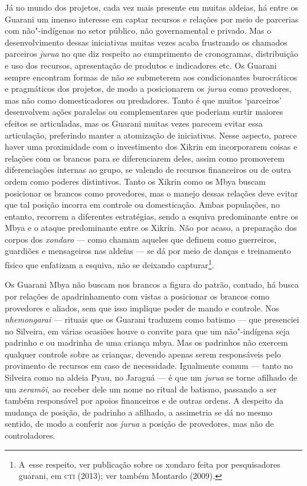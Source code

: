 Já no mundo dos projetos, cada vez mais presente em muitas aldeias, há
entre os Guarani um imenso interesse em captar recursos e relações por
meio de parcerias com não"-indígenas no setor público, não governamental
e privado. Mas o desenvolvimento dessas iniciativas muitas vezes acaba
frustrando os chamados parceiros \emph{jurua} no que diz respeito ao
cumprimento de cronogramas, distribuição e uso dos recursos,
apresentação de produtos e indicadores etc. Os Guarani sempre encontram
formas de não se submeterem aos condicionantes burocráticos e
pragmáticos dos projetos, de modo a posicionarem os \emph{jurua} como
provedores, mas não como domesticadores ou predadores. Tanto é que
muitos `parceiros' desenvolvem ações paralelas ou complementares que
poderiam surtir maiores efeitos se articuladas, mas os Guarani muitas
vezes parecem evitar essa articulação, preferindo manter a atomização
de iniciativas. Nesse aspecto, parece haver uma proximidade com o
investimento dos Xikrin em incorporarem coisas e relações com os
brancos para se diferenciarem deles, assim como promoverem
diferenciações internas ao grupo, se valendo de recursos financeiros ou
de outra ordem como poderes distintivos. Tanto os Xikrin como os Mbya
buscam posicionar os brancos como provedores, mas o manejo dessas
relações deve evitar que tal posição incorra em controle ou
domesticação. Ambas populações, no entanto, recorrem a diferentes
estratégias, sendo a esquiva predominante entre os Mbya e o ataque
predominante entre os Xikrin. Não por acaso, a preparação dos corpos
dos \emph{xondaro} --- como chamam aqueles que definem como guerreiros,
guardiões e mensageiros nas aldeias --- se dá por meio de danças e
treinamento físico que enfatizam a esquiva, não se deixando
capturar\footnote{A~esse respeito, ver publicação sobre os xondaro
feita por pesquisadores guarani, em \textsc{cti} (2013); ver também Montardo
(2009).}.

Os Guarani Mbya não buscam nos brancos a figura do patrão, contudo, há
busca por relações de apadrinhamento com vistas a posicionar os brancos
como provedores e aliados, sem que isso implique poder de mando e
controle. Nos \emph{nhemongarai} --- rituais que os Guarani traduzem como
batismo --- que presenciei no Silveira, em várias ocasiões houve o
convite para que um não"-indígena seja padrinho e ou madrinha de uma
criança mbya. Mas os padrinhos não exercem qualquer controle sobre as
crianças, devendo apenas serem responsáveis pelo provimento de recursos
em caso de necessidade. Igualmente comum --- tanto no Silveira como na
aldeia Pyau, no Jaraguá --- é que um \emph{jurua} se torne afilhado de um
\emph{xeramõi}, ao receber dele um nome no ritual de batismo, passando a ser
também responsável por apoios financeiros e de outras ordens. A
despeito da mudança de posição, de padrinho a afilhado, a assimetria se
dá no mesmo sentido, de modo a conferir aos \emph{jurua} a posição de
provedores, mas não de controladores.

